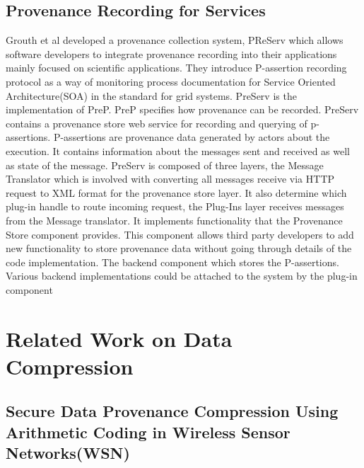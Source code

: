 \subsection{Provenance Recording for Services}
Grouth et al \cite{groth} developed a provenance collection system, PReServ which allows software developers to integrate provenance recording into their applications mainly focused on scientific applications. They introduce P-assertion recording protocol as a way of monitoring process  documentation for Service Oriented Architecture(SOA) in the standard for grid systems. PreServ is the implementation of PreP. PreP specifies how provenance can be recorded. PreServ contains a provenance store web service for recording and querying of p-assertions. P-assertions are provenance data generated by actors about the execution. It contains information about the messages sent and received as well as state of the message. PreServ is composed of three layers, the Message Translator which is involved with converting all messages receive via HTTP request to XML format for the provenance store layer. It also determine which plug-in handle to route incoming request, the  Plug-Ins layer receives messages from the Message translator. It implements functionality that the Provenance Store component provides. This component allows third party developers to add new functionality to store provenance data without going through details of the code implementation. The backend component which stores the P-assertions. Various backend implementations could be attached to the system by the plug-in component



\section{Related Work on Data Compression}

\subsection{Secure Data Provenance Compression Using Arithmetic Coding in Wireless Sensor Networks(WSN)}

